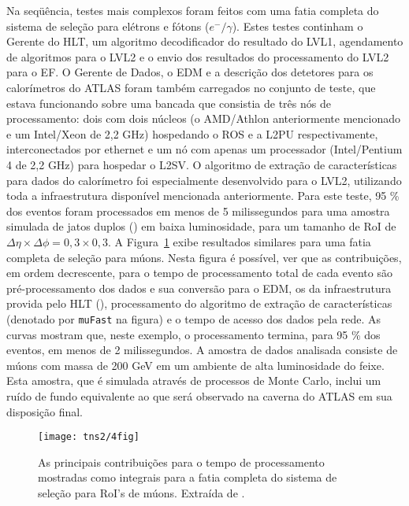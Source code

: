 Na seqüência, testes mais complexos foram feitos com uma fatia completa do
sistema de seleção para elétrons e fótons ($e^-/\gamma$). Estes testes
continham o Gerente do HLT, um algoritmo decodificador do resultado do LVL1,
agendamento de algoritmos para o LVL2 e o envio dos resultados do
processamento do LVL2 para o EF. O Gerente de Dados, o EDM e a descrição dos
detetores para os calorímetros do ATLAS foram também carregados no conjunto de
teste, que estava funcionando sobre uma bancada que consistia de três nós de
processamento: dois com dois núcleos (o AMD/Athlon anteriormente
mencionado e um Intel/Xeon de 2,2 GHz) hospedando o ROS e a L2PU
respectivamente, interconectados por
 ethernet e um nó com apenas um processador (Intel/Pentium 4 de
2,2 GHz) para hospedar o L2SV. O algoritmo de extração de características para
dados do calorímetro foi especialmente desenvolvido para o LVL2, utilizando
toda a infraestrutura disponível mencionada anteriormente. Para este teste, 95
\% dos eventos foram processados em menos de 5 milissegundos para uma amostra
simulada de jatos duplos () em baixa luminosidade, para um
tamanho de RoI de $\Delta\eta \times \Delta\phi = 0,3 \times 0,3$. A
Figura~\ref{fig:l2sc-mu} exibe resultados similares para uma fatia completa de
seleção para múons. Nesta figura é possível, ver que as contribuições, em
ordem decrescente, para o tempo de processamento total de cada evento são
pré-processamento dos dados e sua conversão para o EDM, os  da
infraestrutura provida pelo HLT (), processamento do algoritmo
de extração de características (denotado por \texttt{muFast} na figura) e o
tempo de acesso dos dados pela rede. As curvas mostram que, neste exemplo, o
processamento termina, para 95 \% dos eventos, em menos de 2 milissegundos. A
amostra de dados analisada consiste de múons com massa de 200 GeV em um
ambiente de alta luminosidade do feixe. Esta amostra, que é simulada através
de processos de Monte Carlo, inclui um ruído de fundo equivalente ao que será
observado na caverna do ATLAS em sua disposição final.

\begin{figure}
\begin{center}
\texttt{[image: tns2/4fig]}
\end{center}
\caption{As principais contribuições para o tempo de processamento mostradas
como integrais para a fatia completa do sistema de seleção para RoI's de
múons. Extraída de \cite{hlt-tdr}.}
\label{fig:l2sc-mu}
\end{figure}




